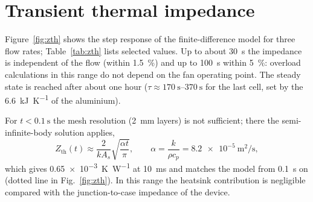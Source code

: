 \documentclass[11pt,a4paper]{article}
\newcommand{\Zth}{Z_{\mathrm{th}}}
\begin{document}
\section{Transient thermal impedance}\label{sec:transient}

Figure~\ref{fig:zth} shows the step response of the finite-difference model for three flow rates; Table~\ref{tab:zth} lists selected values. Up to about \SI{30}{\second} the impedance is independent of the flow (within \SI{1.5}{\percent}) and up to \SI{100}{\second} within \SI{5}{\percent}: overload calculations in this range do not depend on the fan operating point. The steady state is reached after about one hour ($\tau\approx\SIrange{170}{370}{\second}$ for the last cell, set by the \SI{6.6}{\kilo\joule\per\kelvin} of the aluminium).

For $t<\SI{0.1}{\second}$ the mesh resolution (\SI{2}{\milli\metre} layers) is not sufficient; there the semi-infinite-body solution applies,
\begin{equation}
\Zth(t) \approx \frac{2}{k A_s}\sqrt{\frac{\alpha t}{\pi}},\qquad \alpha=\frac{k}{\rho c_p}=\SI{8.2e-5}{\metre\squared\per\second},
\label{eq:semi}
\end{equation}
which gives \SI{0.65e-3}{\kelvin\per\watt} at \SI{10}{\milli\second} and matches the model from \SI{0.1}{\second} on (dotted line in Fig.~\ref{fig:zth}). In this range the heatsink contribution is negligible compared with the junction-to-case impedance of the device.
\end{document}
